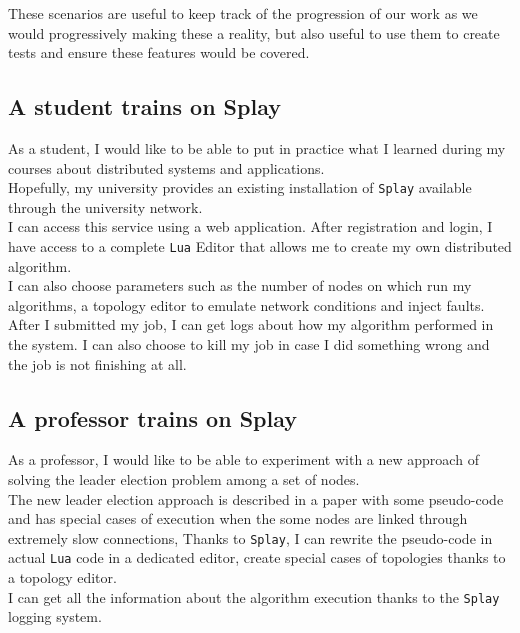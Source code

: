 \documentclass{eplmastersthesis}
\begin{document}
      These scenarios are useful to keep track of the progression of our
      work as we would progressively making these a reality, but also useful
      to use them to create tests and ensure these features would be covered.

      \subsection{A student trains on Splay}

        As a student, I would like to be able to put in practice what I learned
        during my courses about distributed systems and applications.\\
        Hopefully, my university provides an existing installation of \texttt{Splay}
        available through the university network.\\
        I can access this service using a web application. After
        registration and login, I have access to a complete \texttt{Lua} Editor that
        allows me to create my own distributed algorithm.\\
        I can also choose parameters such as the number of nodes on
        which run my algorithms, a topology editor to emulate network
        conditions and inject faults.\\
        After I submitted my job, I can get logs about how my algorithm
        performed in the system. I can also choose to kill my job in case
        I did something wrong and the job is not finishing at all.

      \subsection{A professor trains on Splay}

        As a professor, I would like to be able to experiment with a new
        approach of solving the leader election problem among a set of
        nodes.\\
        The new leader election approach is described in a paper with some
        pseudo-code and has special cases of execution when the some nodes
        are linked through extremely slow connections,
        Thanks to \texttt{Splay}, I can rewrite the pseudo-code in actual
        \texttt{Lua} code in a dedicated editor, create special cases of topologies
        thanks to a topology editor.\\
        I can get all the information about the algorithm execution
        thanks to the \texttt{Splay} logging system.
\end{document}

